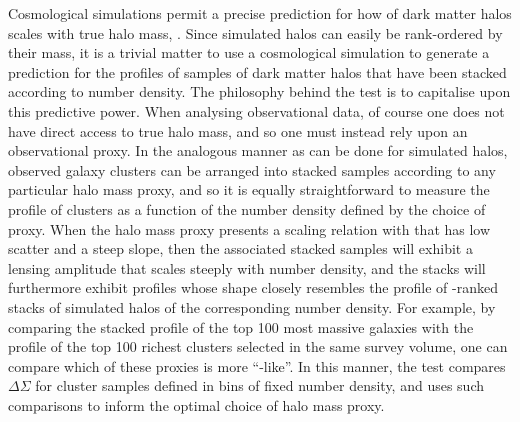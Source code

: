 \documentclass[fleqn,usenatbib,useAMS]{mnras}
\begin{document}
\begin{CJK*}{UTF8}{gbsn}
    Cosmological simulations permit a precise prediction for how \dsigma{} of dark matter halos
    scales with true halo mass, \mvir{}.
    Since simulated halos can easily be rank-ordered by their mass, it is a trivial matter to use a
    cosmological simulation to generate a prediction for the \dsigma{} profiles of samples of dark
    matter halos that have been stacked according to number density.
    The philosophy behind the \topn{} test is to capitalise upon this predictive power.
    When analysing observational data, of course one does not have direct access to true halo mass, 
    and so one must instead rely upon an observational proxy. 
    In the analogous manner as can be done for simulated halos, observed galaxy clusters can be
    arranged into stacked samples according to any particular halo mass proxy, and so it is equally
    straightforward to measure the \dsigma{} profile of clusters as a function of the number density
    defined by the choice of proxy. 
    When the halo mass proxy presents a scaling relation with \mvir{} that has low scatter and a
    steep slope, then the associated stacked samples will exhibit a lensing amplitude that scales
    steeply with number density, and the stacks will furthermore exhibit \dsigma{} profiles whose
    shape closely resembles the profile of \mvir{}-ranked stacks of simulated halos of the
    corresponding number density.
    For example, by comparing the stacked \dsigma{} profile of the top 100 most massive galaxies
    with the \dsigma{} profile of the top 100 richest clusters selected in the same survey volume,
    one can compare which of these proxies is more ``\mvir{}-like''.
    In this manner, the \topn{} test compares $\Delta\Sigma$ for cluster samples defined in bins of
    fixed number density, and uses such comparisons to inform the optimal choice of halo mass proxy.
    

\end{CJK*}
\end{document}
